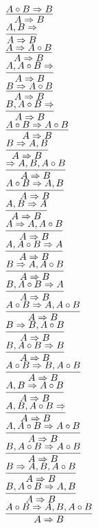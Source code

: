 \documentclass[11pt]{article}
\begin{document}
\begin{center}
\bigskip
\\$\infer{A\Rightarrow B}{A\circ B\Rightarrow B}$
\bigskip
\\$\infer{A\Rightarrow B}{A, B\Rightarrow }$
\bigskip
\\$\infer{A\Rightarrow B}{A\Rightarrow A\circ B}$
\bigskip
\\$\infer{A\Rightarrow B}{A, A\circ B\Rightarrow }$
\bigskip
\\$\infer{A\Rightarrow B}{B\Rightarrow A\circ B}$
\bigskip
\\$\infer{A\Rightarrow B}{B, A\circ B\Rightarrow }$
\bigskip
\\$\infer{A\Rightarrow B}{A\circ B\Rightarrow A\circ B}$
\bigskip
\\$\infer{A\Rightarrow B}{B\Rightarrow A, B}$
\bigskip
\\$\infer{A\Rightarrow B}{\Rightarrow A, B, A\circ B}$
\bigskip
\\$\infer{A\Rightarrow B}{A\circ B\Rightarrow A, B}$
\bigskip
\\$\infer{A\Rightarrow B}{A, B\Rightarrow A}$
\bigskip
\\$\infer{A\Rightarrow B}{A\Rightarrow A, A\circ B}$
\bigskip
\\$\infer{A\Rightarrow B}{A, A\circ B\Rightarrow A}$
\bigskip
\\$\infer{A\Rightarrow B}{B\Rightarrow A, A\circ B}$
\bigskip
\\$\infer{A\Rightarrow B}{B, A\circ B\Rightarrow A}$
\bigskip
\\$\infer{A\Rightarrow B}{A\circ B\Rightarrow A, A\circ B}$
\bigskip
\\$\infer{A\Rightarrow B}{B\Rightarrow B, A\circ B}$
\bigskip
\\$\infer{A\Rightarrow B}{B, A\circ B\Rightarrow B}$
\bigskip
\\$\infer{A\Rightarrow B}{A\circ B\Rightarrow B, A\circ B}$
\bigskip
\\$\infer{A\Rightarrow B}{A, B\Rightarrow A\circ B}$
\bigskip
\\$\infer{A\Rightarrow B}{A, B, A\circ B\Rightarrow }$
\bigskip
\\$\infer{A\Rightarrow B}{A, A\circ B\Rightarrow A\circ B}$
\bigskip
\\$\infer{A\Rightarrow B}{B, A\circ B\Rightarrow A\circ B}$
\bigskip
\\$\infer{A\Rightarrow B}{B\Rightarrow A, B, A\circ B}$
\bigskip
\\$\infer{A\Rightarrow B}{B, A\circ B\Rightarrow A, B}$
\bigskip
\\$\infer{A\Rightarrow B}{A\circ B\Rightarrow A, B, A\circ B}$

\end{center}
\end{document}
